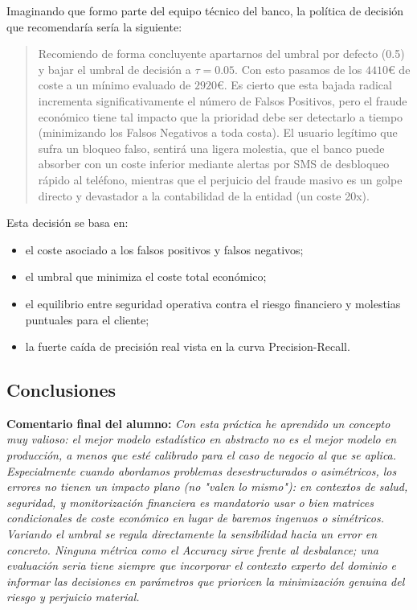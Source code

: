 Imaginando que formo parte del equipo técnico del banco, la política de decisión que recomendaría sería la siguiente:

\begin{quote}
  Recomiendo de forma concluyente apartarnos del umbral por defecto (0.5) y bajar el umbral de decisión a $\tau = 0.05$. Con esto pasamos de los $4410$€ de coste a un mínimo evaluado de $2920$€. Es cierto que esta bajada radical incrementa significativamente el número de Falsos Positivos, pero el fraude económico tiene tal impacto que la prioridad debe ser detectarlo a tiempo (minimizando los Falsos Negativos a toda costa). El usuario legítimo que sufra un bloqueo falso, sentirá una ligera molestia, que el banco puede absorber con un coste inferior mediante alertas por SMS de desbloqueo rápido al teléfono, mientras que el perjuicio del fraude masivo es un golpe directo y devastador a la contabilidad de la entidad (un coste 20x).
\end{quote}

\noindent Esta decisión se basa en:
\begin{itemize}
  \item el coste asociado a los falsos positivos y falsos negativos;
  \item el umbral que minimiza el coste total económico;
  \item el equilibrio entre seguridad operativa contra el riesgo financiero y molestias puntuales para el cliente;
  \item la fuerte caída de precisión real vista en la curva Precision-Recall.
\end{itemize}

\subsection{Conclusiones}

\textbf{Comentario final del alumno:}
\textit{Con esta práctica he aprendido un concepto muy valioso: el mejor modelo estadístico en abstracto no es el mejor modelo en producción, a menos que esté calibrado para el caso de negocio al que se aplica. Especialmente cuando abordamos problemas desestructurados o asimétricos, los errores no tienen un impacto plano (no "valen lo mismo"): en contextos de salud, seguridad, y monitorización financiera es mandatorio usar o bien matrices condicionales de coste económico en lugar de baremos ingenuos o simétricos. Variando el umbral se regula directamente la sensibilidad hacia un error en concreto. Ninguna métrica como el \emph{Accuracy} sirve frente al desbalance; una evaluación seria tiene siempre que incorporar el contexto experto del dominio e informar las decisiones en parámetros que prioricen la minimización genuina del riesgo y perjuicio material.}